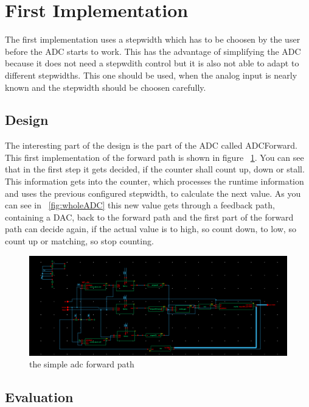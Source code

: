 \section{First Implementation}

The first implementation uses a stepwidth which has to be choosen by the user before the ADC starts to work. This has the advantage of simplifying the ADC because it does not need a stepwdith control but it is also not able to adapt to different stepwidths. This one should be used, when the analog input is nearly known and the stepwidth should be choosen carefully.

\subsection{Design}

The interesting part of the design is the part of the ADC called ADCForward. This first implementation of the forward path is shown in figure ~\ref{fig:simpleForward}. You can see that in the first step it gets decided, if the counter shall count up, down or stall. This information gets into the counter, which processes the runtime information and uses the previous configured stepwidth, to calculate the next value. As you can see in ~\ref{fig:wholeADC} this new value gets through a feedback path, containing a DAC, back to the forward path and the first part of the forward path can decide again, if the actual value is to high, so count down, to low, so count up or matching, so stop counting.

\begin{figure}[h]
	\centering
	\includegraphics[scale=0.45]{images/adc/adcForward.png}
	\caption{the simple adc forward path}
	\label{fig:simpleForward}
\end{figure}

\subsection{Evaluation}

